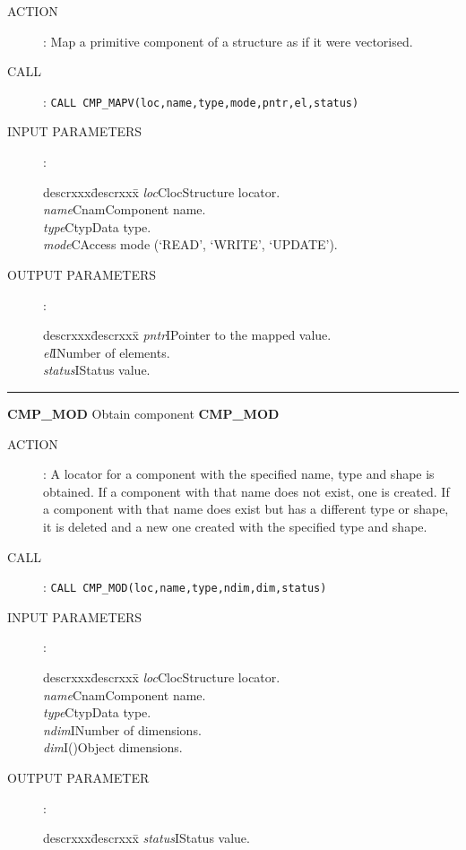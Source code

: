 \begin{description}
\item [ACTION]:
Map a primitive component of a structure as if it were vectorised.
\item [CALL]:
{\tt CALL CMP\_MAPV(loc,name,type,mode,pntr,el,status)}
\item [INPUT PARAMETERS]:
\begin{tabbing}
descrxxx\=descrxxx\=\kill
{\em loc}\>Cloc\>Structure locator.\\
{\em name}\>Cnam\>Component name.\\
{\em type}\>Ctyp\>Data type.\\
{\em mode}\>C\>Access mode (`READ', `WRITE', `UPDATE').
\end{tabbing}
\item [OUTPUT PARAMETERS]:
\begin{tabbing}
descrxxx\=descrxxx\=\kill
{\em pntr}\>I\>Pointer to the mapped value.\\
{\em el}\>I\>Number of elements.\\
{\em status}\>I\>Status value.
\end{tabbing}
\end{description}
\goodbreak
\rule{\textwidth}{0.3mm}
{\Large {\bf CMP\_MOD} \hfill Obtain component \hfill {\bf CMP\_MOD}}
\begin{description}
\item [ACTION]:
A locator for a component with the specified name, type and shape is obtained.
If a component with that name does not exist, one is created.
If a component with that name does exist but has a different type or shape, it
is deleted and a new one created with the specified type and shape.
\item [CALL]:
{\tt CALL CMP\_MOD(loc,name,type,ndim,dim,status)}
\item [INPUT PARAMETERS]:
\begin{tabbing}
descrxxx\=descrxxx\=\kill
{\em loc}\>Cloc\>Structure locator.\\
{\em name}\>Cnam\>Component name.\\
{\em type}\>Ctyp\>Data type.\\
{\em ndim}\>I\>Number of dimensions.\\
{\em dim}\>I()\>Object dimensions.
\end{tabbing}
\item [OUTPUT PARAMETER]:
\begin{tabbing}
descrxxx\=descrxxx\=\kill
{\em status}\>I\>Status value.
\end{tabbing}
\end{description}
